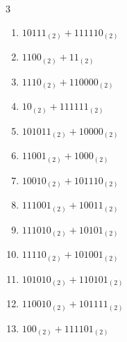 \begin{multicols}{3}
\begin{enumerate}
  \item $10111_{(2)} + 111110_{(2)}$


  \item $1100_{(2)} + 11_{(2)}$


  \item $1110_{(2)} + 110000_{(2)}$


\columnbreak %

  \item $10_{(2)} + 111111_{(2)}$


  \item $101011_{(2)} + 10000_{(2)}$


  \item $11001_{(2)} + 1000_{(2)}$


  \item $10010_{(2)} + 101110_{(2)}$


  \item $111001_{(2)} + 10011_{(2)}$


  \item $111010_{(2)} + 10101_{(2)}$


  \item $11110_{(2)} + 101001_{(2)}$


  \item $101010_{(2)} + 110101_{(2)}$


  \item $110010_{(2)} + 101111_{(2)}$


  \item $100_{(2)} + 111101_{(2)}$


\columnbreak %


\end{enumerate}
\end{multicols}
